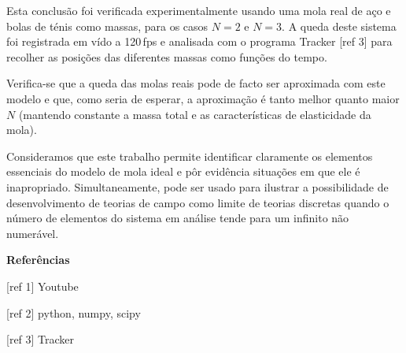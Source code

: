 \documentclass{report}
\begin{document}
  Esta conclusão foi verificada experimentalmente usando uma mola real de aço e
  bolas de ténis como massas, para os casos $N=2$ e $N=3$. A queda deste sistema
  foi registrada em vído a 120\,fps e analisada com o programa Tracker [ref 3]
  para recolher as posições das diferentes massas como funções do tempo.

  Verifica-se que a queda das molas reais pode de facto ser aproximada
  com este modelo e que, como seria de esperar, a aproximação é tanto melhor
  quanto maior $N$ (mantendo constante a massa total e as características de
  elasticidade da mola). 

  Consideramos que este trabalho permite identificar claramente os elementos
  essenciais do modelo de mola ideal e pôr evidência situações em que ele é
  inapropriado. Simultaneamente, pode ser usado para ilustrar a possibilidade de
  desenvolvimento de teorias de campo como limite de teorias discretas quando o
  número de elementos do sistema em análise tende para um infinito não
  numerável.

\vspace{.5em}
\textbf{Referências}

[ref 1] Youtube

[ref 2] python, numpy, scipy

[ref 3] Tracker
\end{document}
